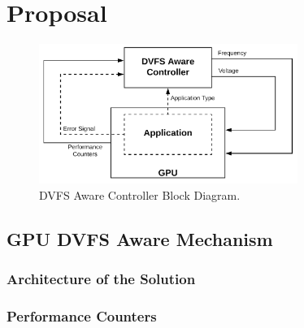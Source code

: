 
\chapter{Proposal}
\label{chapter:implementation}


\begin{figure}[!htb]
  \centering
  \includegraphics[width=0.75\textwidth]{Figures/Proposel/DVFS_Aware_Controller.png}
  \caption[Controller]{DVFS Aware Controller Block Diagram.}
  \label{fig:controlerDVFSaware}
\end{figure}



\section{GPU DVFS Aware Mechanism}
\label{section:solarch}


\subsection{Architecture of the Solution}
\label{section:solarch}

\subsection{Performance Counters}
\label{section:solarch}

